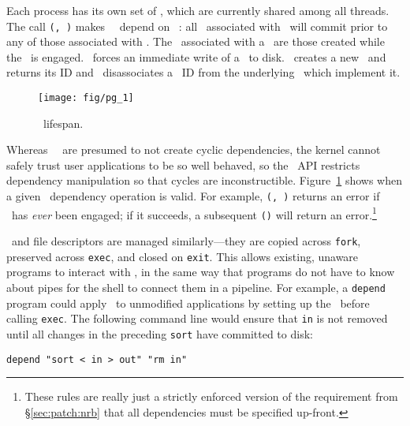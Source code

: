 Each process has its own set of \patchgroups, which are currently shared
among all threads.
%
The call \texttt{\pgDepend(\pgQg, \pgPg)} makes \patchgroup\ \pgQg\ depend on
\patchgroup\ \pgPg: all \patches\ associated with \pgPg\ will
commit prior to any of those associated with \pgQg.
%
The \patches\ associated with a \patchgroup\ are those created while
the \patchgroup\ is engaged.
%
\pgSync\ forces an immediate write of a \patchgroup\ to disk.
%
\pgCreate\ creates a new \patchgroup\ and returns its ID
%
and \pgClose\ disassociates a \patchgroup\ ID from the underlying
\patches\ which implement it.

\begin{figure}[t]
\centering
\texttt{[image: fig/pg\_1]}
\caption{\label{fig:patchgroup-transitions} \Patchgroup\ lifespan.}
\end{figure}
%
Whereas \Kudos\ \modules\ are presumed to not create cyclic
dependencies, the kernel cannot safely trust user applications to be
so well behaved, so
%
the \patchgroup\ API restricts dependency manipulation so that cycles are
inconstructible.
%
Figure~\ref{fig:patchgroup-transitions} shows when a given
\patchgroup\ dependency operation is valid.
%
For example, \texttt{\pgDepend(\pgQg, \pgPg)} returns an error if
\pgQg\ has \emph{ever} been engaged; if it succeeds, a subsequent
\texttt{\pgEngage(\pgPg)} will return an error.\footnote{These rules are really
just a strictly enforced version of the requirement from \S\ref{sec:patch:nrb}
that all dependencies must be specified up-front.}

\Patchgroups\ and file descriptors are managed similarly---they are copied
across \texttt{fork}, preserved across \texttt{exec}, and closed on
\texttt{exit}.
%
This allows existing, unaware programs to interact with \patchgroups,
in the same way that programs do not have to know about pipes for the
shell to connect them in a pipeline.
%
For example, a \texttt{depend} program could apply \patchgroups\ to
unmodified applications by setting up the \patchgroups\ before calling
\texttt{exec}.  The following command line would ensure that \texttt{in} is
not removed until all changes in the preceding \texttt{sort} have committed
to disk:

\vspace{-0.5\baselineskip}
\begin{center}
\begin{small}
\verb+depend "sort < in > out" "rm in"+
\end{small}
\end{center}
\vspace{-0.5\baselineskip}

